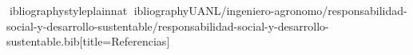 \documentclass[spanish,letterpaper,oneside]{article}
\begin{document}
\hypersetup{pageanchor=false}
\begingroup
\fontsize{14}{17}\selectfont
\renewcommand{\Huge}{\fontsize{14}{17}\selectfont\bfseries}
\renewcommand{\large}{\fontsize{14}{17}\selectfont}
\templatePortrait
\clearpage
\endgroup
\hypersetup{pageanchor=true}
\templatePagecfg
\singlespacing
\setlength{\tabcolsep}{9pt}
\renewcommand{\arraystretch}{1.18}

\clearpage
ibliographystyle{plainnat}
ibliography{UANL/ingeniero-agronomo/responsabilidad-social-y-desarrollo-sustentable/responsabilidad-social-y-desarrollo-sustentable.bib}[title={Referencias}]
\end{document}
